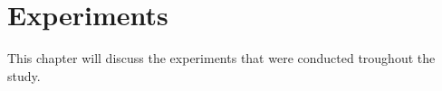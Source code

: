 \chapter{Experiments}

This chapter will discuss the experiments that were conducted troughout the study.



\newpage


\newpage


\newpage
